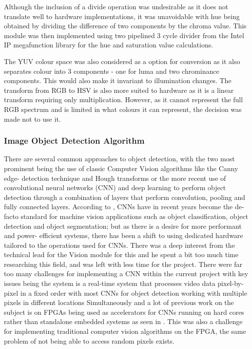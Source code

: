 \documentclass[a4paper]{article}
\begin{document}
Although the inclusion of a divide operation was undesirable as it does not 
translate well to hardware implementations, it was unavoidable with hue being 
obtained by dividing the difference of two components by the chroma value. This 
module was then implemented using two pipelined 3 cycle divider from the Intel IP
megafunction library for the hue and saturation value calculations.  

The YUV colour space was also considered as a option for conversion as it also
separates colour into 3 components - one for luma and two chrominance components.
This would also make it invariant to illumination changes. The transform from RGB
to HSV is also more suited to hardware as it is a linear transform requiring only
multiplication. However, as it cannot represent the full RGB spectrum and is 
limited in what colours it can represent, the decision was made not to use it.    


\subsubsection{Image Object Detection Algorithm}

There are several common approaches to object detection, with the two most 
prominent being the use of classic Computer Vision algorithms like the Canny edge-
detection technique and Hough transforms or the more recent use of convolutional
neural networks (CNN) and deep learning to perform object detection through a 
combination of layers that perform convolution, pooling and fully connected layers. 
According to \cite{DBLP:journals/corr/abs-1806-01683}, CNNs have in recent years 
become the de-facto standard for machine vision applications such as object 
classification, object detection and object segmentation; but as there is a desire 
for more performant and power- efficient systems, there has been a shift to 
using dedicated hardware tailored to the operations used for CNNs. There was a 
deep interest from the technical lead for the Vision module for this and he spent 
a bit too much time researching this field, and was left with less time for the 
project. There were far too many challenges for implementing a CNN within the 
current project with key issues being the system is a real-time system that 
processes video data pixel-by-pixel in a fixed order with most CNNs for object 
detection working with multiple pixels in different locations Simultaneously and
a lot of previous work on the subject is on FPGAs being used as accelerators for 
CNNs running on hard cores rather than standalone embedded systems as seen in \cite{DBLP:journals/corr/abs-1806-01683}
. This was also a challenge for implementing traditional computer vision 
algorithms on the FPGA,  the same problem of not being able to access random 
pixels exists. 
\end{document}
